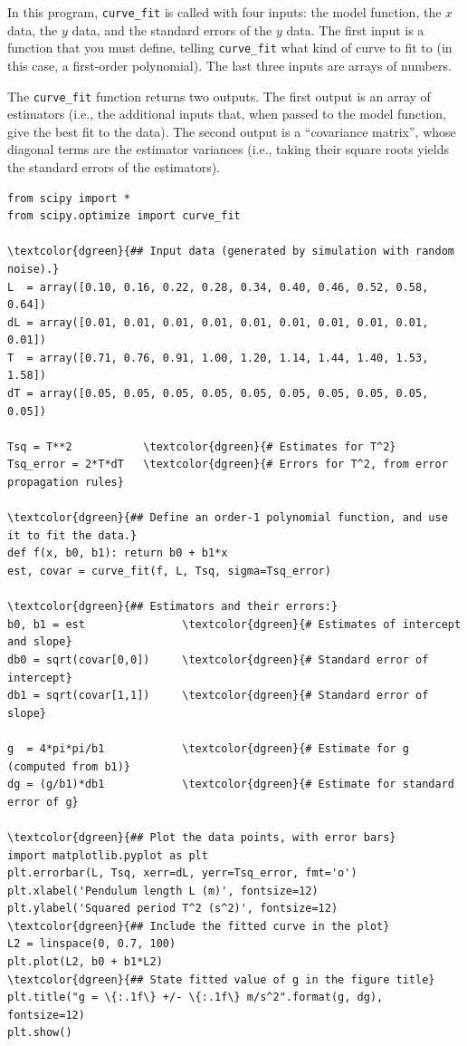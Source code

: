 \documentclass[11pt,a4paper]{article}
\begin{document}
In this program, \texttt{curve\_fit} is called with four inputs: the
model function, the $x$ data, the $y$ data, and the standard errors of
the $y$ data.  The first input is a function that you must define,
telling \texttt{curve\_fit} what kind of curve to fit to (in this
case, a first-order polynomial).  The last three inputs are arrays of
numbers.

The \texttt{curve\_fit} function returns two outputs.  The first
output is an array of estimators (i.e., the additional inputs that,
when passed to the model function, give the best fit to the data).
The second output is a ``covariance matrix'', whose diagonal terms are
the estimator variances (i.e., taking their square roots yields the
standard errors of the estimators).

\begin{Verbatim}[frame=single,baselinestretch=1,fontsize=\small,commandchars=\\\{\}]
from scipy import *
from scipy.optimize import curve_fit

\textcolor{dgreen}{## Input data (generated by simulation with random noise).}
L  = array([0.10, 0.16, 0.22, 0.28, 0.34, 0.40, 0.46, 0.52, 0.58, 0.64])
dL = array([0.01, 0.01, 0.01, 0.01, 0.01, 0.01, 0.01, 0.01, 0.01, 0.01])
T  = array([0.71, 0.76, 0.91, 1.00, 1.20, 1.14, 1.44, 1.40, 1.53, 1.58])
dT = array([0.05, 0.05, 0.05, 0.05, 0.05, 0.05, 0.05, 0.05, 0.05, 0.05])

Tsq = T**2           \textcolor{dgreen}{# Estimates for T^2}
Tsq_error = 2*T*dT   \textcolor{dgreen}{# Errors for T^2, from error propagation rules}

\textcolor{dgreen}{## Define an order-1 polynomial function, and use it to fit the data.}
def f(x, b0, b1): return b0 + b1*x
est, covar = curve_fit(f, L, Tsq, sigma=Tsq_error)

\textcolor{dgreen}{## Estimators and their errors:}
b0, b1 = est               \textcolor{dgreen}{# Estimates of intercept and slope}
db0 = sqrt(covar[0,0])     \textcolor{dgreen}{# Standard error of intercept}
db1 = sqrt(covar[1,1])     \textcolor{dgreen}{# Standard error of slope}

g  = 4*pi*pi/b1            \textcolor{dgreen}{# Estimate for g (computed from b1)}
dg = (g/b1)*db1            \textcolor{dgreen}{# Estimate for standard error of g}

\textcolor{dgreen}{## Plot the data points, with error bars}
import matplotlib.pyplot as plt
plt.errorbar(L, Tsq, xerr=dL, yerr=Tsq_error, fmt='o')
plt.xlabel('Pendulum length L (m)', fontsize=12)
plt.ylabel('Squared period T^2 (s^2)', fontsize=12)
\textcolor{dgreen}{## Include the fitted curve in the plot}
L2 = linspace(0, 0.7, 100)
plt.plot(L2, b0 + b1*L2)
\textcolor{dgreen}{## State fitted value of g in the figure title}
plt.title("g = \{:.1f\} +/- \{:.1f\} m/s^2".format(g, dg), fontsize=12)
plt.show()
\end{Verbatim}
\end{document}
